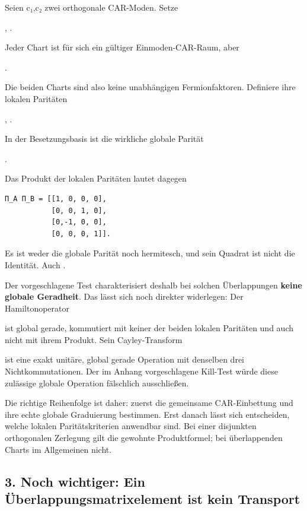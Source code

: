 Seien c₁,c₂ zwei orthogonale CAR-Moden. Setze

, .

Jeder Chart ist für sich ein gültiger Einmoden-CAR-Raum, aber

.

Die beiden Charts sind also keine unabhängigen Fermionfaktoren.
Definiere ihre lokalen Paritäten

, .

In der Besetzungsbasis  ist die wirkliche
globale Parität

.

Das Produkt der lokalen Paritäten lautet dagegen

\begin{verbatim}
Π_A Π_B = [[1, 0, 0, 0],
           [0, 0, 1, 0],
           [0,-1, 0, 0],
           [0, 0, 0, 1]].
\end{verbatim}

Es ist weder die globale Parität noch hermitesch, und sein Quadrat ist
nicht die Identität. Auch .

Der vorgeschlagene Test  charakterisiert
deshalb bei solchen Überlappungen \textbf{keine globale Geradheit}. Das
lässt sich noch direkter widerlegen: Der Hamiltonoperator


ist global gerade, kommutiert mit keiner der beiden lokalen Paritäten
und auch nicht mit ihrem Produkt. Sein Cayley-Transform


ist eine exakt unitäre, global gerade Operation mit denselben drei
Nichtkommutationen. Der im Anhang vorgeschlagene Kill-Test würde diese
zulässige globale Operation fälschlich ausschließen.

Die richtige Reihenfolge ist daher: zuerst die gemeinsame CAR-Einbettung
und ihre echte globale Graduierung bestimmen. Erst danach lässt sich
entscheiden, welche lokalen Paritätskriterien anwendbar sind. Bei einer
disjunkten orthogonalen Zerlegung gilt die gewohnte Produktformel; bei
überlappenden Charts im Allgemeinen nicht.

\subsection{3. Noch wichtiger: Ein Überlappungsmatrixelement ist kein
Transport}\label{noch-wichtiger-ein-uxfcberlappungsmatrixelement-ist-kein-transport}

